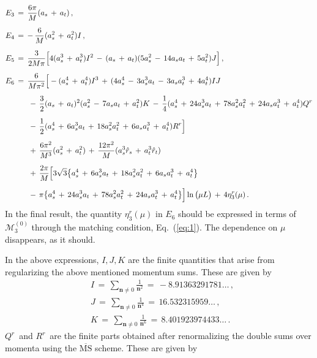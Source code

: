\documentclass[12pt,prd,tightenlines,nofootinbib]{revtex4-2}
\begin{document}
\begin{align}
    &E_{3}\,=\,  \frac{6\pi}{M}(a_{s}\, +\, a_{t})\,,\nonumber\\[2mm]
    &E_{4}\,=\, -\, \frac{6}{M}(a^{2}_{s}\, +\, a^{2}_{t})I\,,\nonumber\\[2mm]
    &E_{5}\,=\, \frac{3}{2M\pi}\Big[ 4(a^{3}_{s}\, +\, a^{3}_{t})I^{2}\, -\, (a_{s}\, + \, a_{t})(5a^{2}_{s}\, -\, 14a_{s}a_{t}\,+\, 5a^{2}_{t})J \Big]\,,\nonumber\\[2mm]
    &E_{6}\,=\,\frac{6}{M\pi^{2}}\Big[ -(a^{4}_{s}\,+\,a^{4}_{t})I^{3}\,+\, (4a^{4}_{s}\,-\, 3a^{3}_{s}a_{t}\,-\, 3a_{s}a^{3}_{t}\,+\, 4a^{4}_{t})IJ\nonumber\\[2mm]
    &\hspace{30pt}-\, \frac{3}{2}(a_{s}\,+\, a_{t})^{2}(a^{2}_{s}\,-\,7a_{s}a_{t}\,+\,a^{2}_{t})K\,-\,\frac{1}{4}(a^{4}_{s}\,+\, 24a^{3}_{s}a_{t}\,+\,78a^{2}_{s}a^{2}_{t}\,+\,24a_{s}a^{3}_{t}\,+\, a^{4}_{t})Q^{r}\nonumber\\[2mm]
    &\hspace{30pt}-\, \frac{1}{2}(a^{4}_{s}\,+\, 6a^{3}_{s}a_{t}\,+\,18a^{2}_{s}a^{2}_{t}\,+\,6a_{s}a^{3}_{t}\,+\, a^{4}_{t})R^{r}\Big]\nonumber\\[2mm]
    &\hspace{30pt}+\, \frac{6\pi^{2}}{M^{3}}(a^{2}_{s}\,+\,a^{2}_{t})\,+\, \frac{12\pi^{2}}{M}(a^{3}_{s}\Hat{r}_{s}\,+\,a^{3}_{t}\Hat{r}_{t})\nonumber\\[2mm]
    &\hspace{30pt}+\, \frac{2\pi}{M}\Big[ 3\sqrt{3}\big\{ a_{s}^{4}\, +\, 6a_{s}^{3}a_{t} \, +\, 18 a_{s}^{2}a_{t}^{2}\, + \, 6a_{s}a_{t}^{3}\, +\, a_{t}^{4} \big\} \nonumber\\[2mm]
    &\hspace{30pt}-\, \pi\big\{ a_{s}^{4}\, +\, 24a_{s}^{3}a_{t} \, +\, 78 a_{s}^{2}a_{t}^{2}\, + \, 24a_{s}a_{t}^{3}\, +\, a_{t}^{4} \big\} \Big]\ln{\big(\mu L\big)} \,+\,4\eta^{r}_{3}(\mu)\,.\label{eqimp}
\end{align}
In the final result, the quantity $\eta^r_{3}(\mu)$ in $E_6$ should be expressed in terms of
$\mathscr{M}_3^{(0)}$ through the matching condition, Eq.~(\ref{eq:1}).
The dependence on $\mu$ disappears, as it should.



In the above expressions, $I,J,K$ are the finite quantities that arise from regularizing the above mentioned momentum sums. These are given by
\begin{align}
    &I \,=\, \sum_{\textbf{n}\neq 0} \frac{1}{\textbf{n}^{2}}\,=\, -8.91363291781\dotsc\,,\nonumber\\[2mm]
    &J \,=\, \sum_{\textbf{n}\neq 0} \frac{1}{\textbf{n}^{4}}\,=\, 16.532315959\dotsc\,,\nonumber\\[2mm]
    &K \,=\, \sum_{\textbf{n}\neq 0} \frac{1}{\textbf{n}^{6}}\,=\, 8.401923974433\dotsc\,.
\end{align}
$Q^{r}\,$ and $R^{r}\,$ are the finite parts obtained after renormalizing the double sums over momenta using the $\overline{\text{MS}}$ scheme. These are given by
\end{document}
